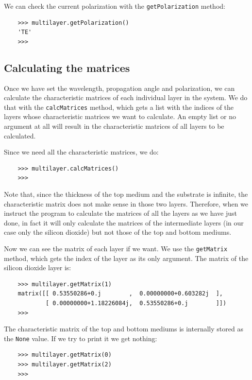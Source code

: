 \documentclass[a4paper,11pt,aps,final]{revtex4}
\begin{document}
We can check the current polarization with the \texttt{getPolarization} method:

\begin{verbatim}
    >>> multilayer.getPolarization()
    'TE'
    >>>
\end{verbatim}

\subsection{Calculating the matrices}

Once we have set the wavelength, propagation angle and polarization, we can calculate the characteristic matrices of each individual layer in the system. We do that with the \texttt{calcMatrices} method, which gets a list with the indices of the layers whose characteristic matrices we want to calculate. An empty list or no argument at all will result in the characteristic matrices of all layers to be calculated.

Since we need all the characteristic matrices, we do:

\begin{verbatim}
    >>> multilayer.calcMatrices()
    >>>
\end{verbatim}

Note that, since the thickness of the top medium and the substrate is infinite, the characteristic matrix does not make sense in those two layers. Therefore, when we instruct the program to calculate the matrices of all the layers as we have just done, in fact it will only calculate the matrices of the intermediate layers (in our case only the silicon dioxide) but not those of the top and bottom mediums.

Now we can see the matrix of each layer if we want. We use the \texttt{getMatrix} method, which gets the index of the layer as its only argument. The matrix of the silicon dioxide layer is:

\begin{verbatim}
    >>> multilayer.getMatrix(1)
    matrix([[ 0.53550286+0.j        ,  0.00000000+0.603282j  ],
            [ 0.00000000+1.18226084j,  0.53550286+0.j        ]])
    >>>
\end{verbatim}

The characteristic matrix of the top and bottom mediums is internally stored as the \texttt{None} value. If we try to print it we get nothing:

\begin{verbatim}
    >>> multilayer.getMatrix(0)
    >>> multilayer.getMatrix(2)
    >>>
\end{verbatim}
\end{document}
